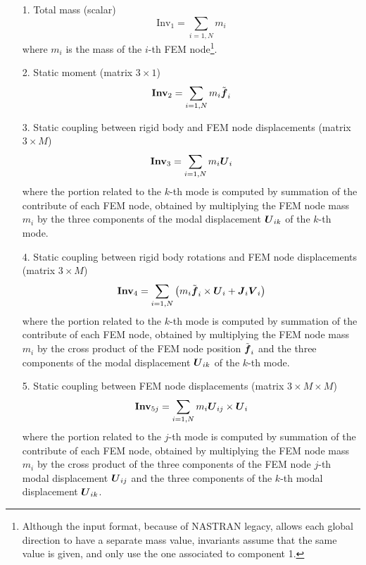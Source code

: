 \begin{enumerate}
\item[1.] Total mass
(scalar)
\begin{equation}
	\mathrm{Inv}_1 = \sum_{i=1,N} m_i
\end{equation}
where $m_i$ is the mass of the $i$-th FEM node\footnote{Although the input
format, because of NASTRAN legacy, allows each global direction to have
a separate mass value, invariants assume that the same value is given,
and only use the one associated to component 1.}.

\item[2.] Static moment
(matrix $3\times{1}$)
\begin{equation}
	\boldsymbol{\mathrm{Inv}}_2 = \sum_{i=1,N} m_i \tilde{\boldsymbol{f}}_i
\end{equation}

\item[3.] Static coupling between rigid body and FEM node displacements
(matrix $3\times{M}$)
\begin{equation}
	\boldsymbol{\mathrm{Inv}}_3 = \sum_{i=1,N} m_i \boldsymbol{U}_i
\end{equation}
where the portion related to the $k$-th mode is computed by summation
of the contribute of each FEM node, obtained by multiplying the FEM node
mass $m_i$ by the three components of the modal displacement $\boldsymbol{U}_{ik}$
of the $k$-th mode.

\item[4.] Static coupling between rigid body rotations and FEM node 
displacements
(matrix $3\times{M}$)
\begin{equation}
	\boldsymbol{\mathrm{Inv}}_4 = \sum_{i=1,N} \left( 
		m_i \tilde{\boldsymbol{f}}_i \times \boldsymbol{U}_i
		+ \boldsymbol{J}_i \boldsymbol{V}_i
	 \right)
\end{equation}
where the portion related to the $k$-th mode is computed by summation
of the contribute of each FEM node, obtained by multiplying the FEM node
mass $m_i$ by the cross product of the FEM node position $\tilde{\boldsymbol{f}}_i$ 
and the three components of the modal displacement $\boldsymbol{U}_{ik}$ of the
$k$-th mode.

\item[5.] Static coupling between FEM node displacements
(matrix $3\times{M}\times{M}$)
\begin{equation}
	\boldsymbol{\mathrm{Inv}}_{5j} = \sum_{i=1,N} m_i \boldsymbol{U}_{ij} \times \boldsymbol{U}_i
\end{equation}
where the portion related to the $j$-th mode is computed by summation
of the contribute of each FEM node, obtained by multiplying the FEM node
mass $m_i$ by the cross product of the three components of the FEM node 
$j$-th modal displacement $\boldsymbol{U}_{ij}$ and the three components of the 
$k$-th modal displacement $\boldsymbol{U}_{ik}$.


\end{enumerate}
